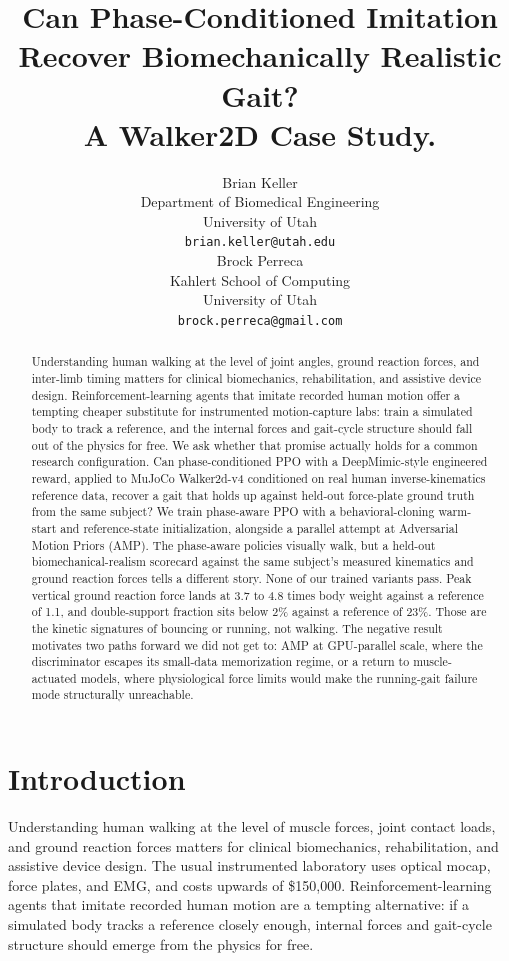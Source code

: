\documentclass{article}
\title{Can Phase-Conditioned Imitation Recover Biomechanically Realistic Gait? \\
A Walker2D Case Study. }
\author{%
  Brian Keller \\
  Department of Biomedical Engineering \\
  University of Utah \\
  \texttt{brian.keller@utah.edu} \\
  \And
  Brock Perreca \\
  Kahlert School of Computing \\
  University of Utah \\
  \texttt{brock.perreca@gmail.com} \\
}
\begin{document}
\maketitle

\begin{abstract}
Understanding human walking at the level of joint angles, ground
reaction forces, and inter-limb timing matters for clinical
biomechanics, rehabilitation, and assistive device design.
Reinforcement-learning agents that imitate recorded human motion
offer a tempting cheaper substitute for instrumented motion-capture
labs: train a simulated body to track a reference, and the internal
forces and gait-cycle structure should fall out of the physics for
free. We ask whether that promise actually holds for a common
research configuration. Can phase-conditioned PPO with a
DeepMimic-style engineered reward, applied to MuJoCo Walker2d-v4
conditioned on real human inverse-kinematics reference data, recover
a gait that holds up against held-out force-plate ground truth from
the same subject? We train phase-aware PPO with a behavioral-cloning
warm-start and reference-state initialization, alongside a parallel
attempt at Adversarial Motion Priors (AMP). The phase-aware policies
visually walk, but a held-out biomechanical-realism scorecard against
the same subject's measured kinematics and ground reaction forces
tells a different story. None of our trained variants pass. Peak
vertical ground reaction force lands at 3.7 to 4.8 times body weight
against a reference of 1.1, and double-support fraction sits below
2\% against a reference of 23\%. Those are the kinetic signatures
of bouncing or running, not walking. The negative result motivates
two paths forward we did not get to: AMP at GPU-parallel scale,
where the discriminator escapes its small-data memorization regime,
or a return to muscle-actuated models, where physiological force
limits would make the running-gait failure mode structurally
unreachable.
\end{abstract}

\section{Introduction}

Understanding human walking at the level of muscle forces, joint
contact loads, and ground reaction forces matters for clinical
biomechanics, rehabilitation, and assistive device design. The
usual instrumented laboratory uses optical mocap, force plates,
and EMG, and costs upwards of \$150{,}000. Reinforcement-learning
agents that imitate recorded human motion are a tempting
alternative: if a simulated body tracks a reference closely enough,
internal forces and gait-cycle structure should emerge from the
physics for free.
\end{document}
